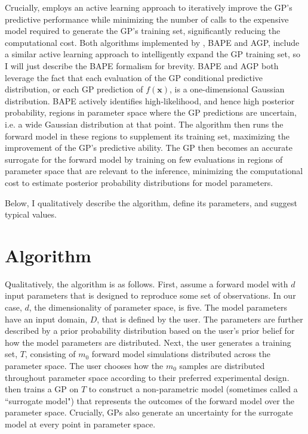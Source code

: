 Crucially, \approxposterior employs an active learning approach to iteratively improve the GP's predictive performance while minimizing the number of calls to the expensive model required to generate the GP's training set, significantly reducing the computational cost. Both algorithms implemented by \approxposterior, BAPE and AGP, include a similar active learning approach to intelligently expand the GP training set, so I will just describe the BAPE formalism for brevity. BAPE and AGP both leverage the fact that each evaluation of the GP conditional predictive distribution, or each GP prediction of $f(\textbf{x})$, is a one-dimensional Gaussian distribution.  BAPE actively identifies high-likelihood, and hence high posterior probability, regions in parameter space where the GP predictions are uncertain, i.e. a wide Gaussian distribution at that point.  The algorithm then runs the forward model in these regions to supplement its training set, maximizing the improvement of the GP's predictive ability.  The GP then becomes an accurate surrogate for the forward model by training on few evaluations in regions of parameter space that are relevant to the inference, minimizing the computational cost to estimate posterior probability distributions for model parameters. 

Below, I qualitatively describe the \approxposterior algorithm, define its parameters, and suggest typical values. 

\section{\approxposterior Algorithm} \label{AP:sec:app}

Qualitatively, the \approxposterior algorithm is as follows. First, assume a forward model with $d$ input parameters that is designed to reproduce some set of observations. In our case, $d$, the dimensionality of parameter space, is five. The model parameters have an input domain, $D$, that is defined by the user. The parameters are further described by a prior probability distribution based on the user's prior belief for how the model parameters are distributed.  Next, the user generates a training set, $T$, consisting of $m_0$ forward model simulations distributed across the parameter space. The user chooses how the $m_0$ samples are distributed throughout parameter space according to their preferred experimental design. \approxposterior then trains a GP on $T$ to construct a non-parametric model (sometimes called a ``surrogate model") that represents the outcomes of the forward model over the parameter space. Crucially, GPs also generate an uncertainty for the surrogate model at every point in parameter space.

